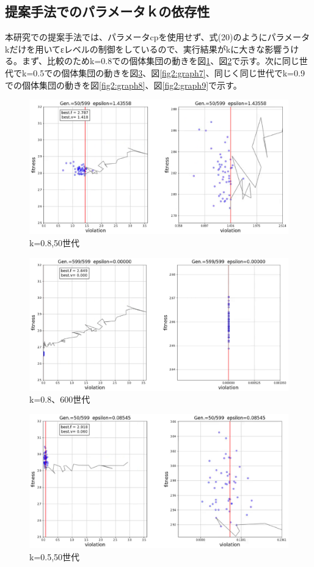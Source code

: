 \documentclass[twocolumn,10pt]{jarticle}
\begin{document}
\subsection{提案手法でのパラメータｋの依存性}
本研究での提案手法では、パラメータcpを使用せず、式(20)のようにパラメータkだけを用いてεレベルの制御をしているので、実行結果がkに大きな影響うける。まず、比較のためk=0.8での個体集団の動きを図\ref{fig2:graph4}、図\ref{fig2:graph5}で示す。次に同じ世代でk=0.5での個体集団の動きを図\ref{fig2:graph6}、図\ref{fig2:graph7}、同じく同じ世代でk=0.9での個体集団の動きを図\ref{fig2:graph8}、図\ref{fig2:graph9}で示す。
\begin{figure}[htbp]
  \centering
  \includegraphics[width=.9\linewidth]{fig2/top_rate=0.8,50.eps}
  \caption{k=0.8,50世代}
\label{fig2:graph4}
\end{figure}
\begin{figure}[htbp]
  \centering
  \includegraphics[width=.9\linewidth]{fig2/top_rate=0.8,600.eps}
  \caption{k=0.8、600世代}
\label{fig2:graph5}
\end{figure}
\begin{figure}[htbp]
  \centering
  \includegraphics[width=.9\linewidth]{fig2/top_rate=0.5,50.eps}
  \caption{k=0.5,50世代}
\label{fig2:graph6}
\end{figure}
\end{document}
